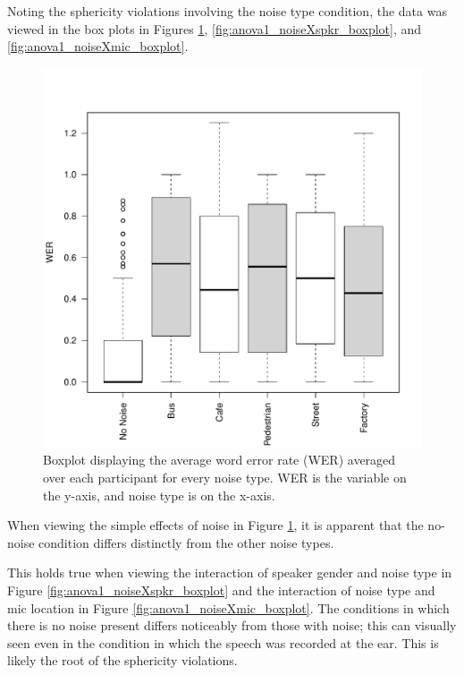 \documentclass[dissertation,copyright]{uathesis}
\makeatletter
\def\maxwidth{ %
  \ifdim\Gin@nat@width>\linewidth
    \linewidth
  \else
    \Gin@nat@width
  \fi
}
\makeatother
\begin{document}
Noting the sphericity violations involving the noise type condition, the data was viewed in the box plots in Figures \ref{fig:anova1_noise_boxplot}, \ref{fig:anova1_noiseXspkr_boxplot}, and \ref{fig:anova1_noiseXmic_boxplot}.
%
\begin{figure}

\includegraphics[width=\maxwidth]{figure/boxplot_noise-1} 

\caption{Boxplot displaying the average word error rate (WER) averaged over each participant for every noise type. WER is the variable on the y-axis, and noise type is on the x-axis.}
\label{fig:anova1_noise_boxplot}
\end{figure}
%
When viewing the simple effects of noise in Figure \ref{fig:anova1_noise_boxplot}, it is apparent that the no-noise condition differs distinctly from the other noise types.

This holds true when viewing the interaction of speaker gender and noise type in Figure \ref{fig:anova1_noiseXspkr_boxplot} and the interaction of noise type and mic location in Figure \ref{fig:anova1_noiseXmic_boxplot}.  The conditions in which there is no noise present differs noticeably from those with noise; this can visually seen even in the condition in which the speech was recorded at the ear. This is likely the root of the sphericity violations.
\end{document}
